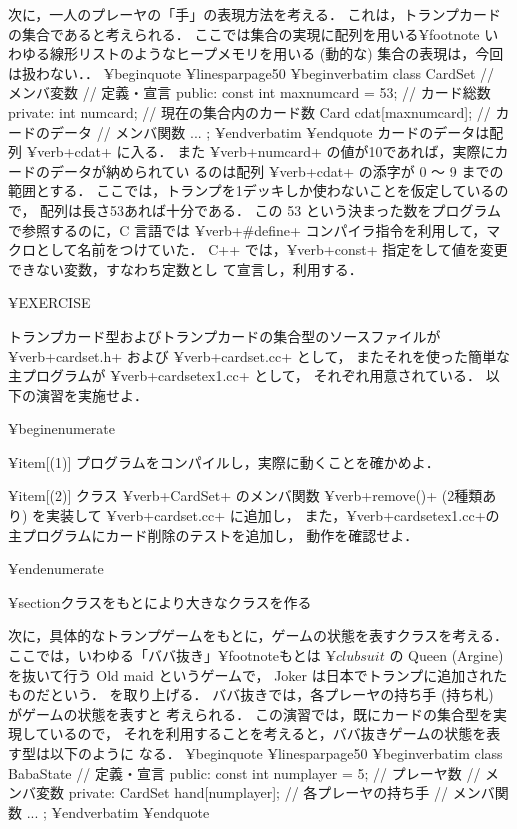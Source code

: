 {{{{{次に，一人のプレーヤの「手」の表現方法を考える．
これは，トランプカードの集合であると考えられる．
ここでは集合の実現に配列を用いる¥footnote{
いわゆる線形リストのようなヒープメモリを用いる (動的な) 集合の表現は，今回は扱わない．}．
¥begin{quote}
¥linesparpage{50}
¥begin{verbatim}
class CardSet {
// メンバ変数
// 定義・宣言
public:
        const int maxnumcard = 53;      // カード総数
private:
        int numcard;            // 現在の集合内のカード数
        Card cdat[maxnumcard];  // カードのデータ
// メンバ関数
	...
};
¥end{verbatim}
¥end{quote}
カードのデータは配列 ¥verb+cdat+ に入る．
また ¥verb+numcard+ の値が10であれば，実際にカードのデータが納められてい
るのは配列 ¥verb+cdat+ の添字が 0 〜 9 までの範囲とする．
ここでは，トランプを1デッキしか使わないことを仮定しているので，
配列は長さ53あれば十分である．
この 53 という決まった数をプログラムで参照するのに，C 言語では
¥verb+#define+ コンパイラ指令を利用して，マクロとして名前をつけていた．
C++ では，¥verb+const+ 指定をして値を変更できない変数，すなわち定数とし
て宣言し，利用する．

¥EXERCISE{
トランプカード型およびトランプカードの集合型のソースファイルが
¥verb+cardset.h+ および ¥verb+cardset.cc+ として，
またそれを使った簡単な主プログラムが ¥verb+cardsetex1.cc+ として，
それぞれ用意されている．
以下の演習を実施せよ．

¥begin{enumerate}

¥item[(1)] プログラムをコンパイルし，実際に動くことを確かめよ．

¥item[(2)] クラス ¥verb+CardSet+ のメンバ関数 ¥verb+remove()+ (2種類あり)
を実装して ¥verb+cardset.cc+ に追加し，
また，¥verb+cardsetex1.cc+の主プログラムにカード削除のテストを追加し，
動作を確認せよ．

¥end{enumerate}

}


¥section{クラスをもとにより大きなクラスを作る}

次に，具体的なトランプゲームをもとに，ゲームの状態を表すクラスを考える．
ここでは，いわゆる「ババ抜き」¥footnote{もとは $¥clubsuit$ の Queen
(Argine) を抜いて行う Old maid というゲームで，
Joker は日本でトランプに追加されたものだという．}
を取り上げる．
ババ抜きでは，各プレーヤの持ち手 (持ち札) がゲームの状態を表すと
考えられる．
この演習では，既にカードの集合型を実現しているので，
それを利用することを考えると，ババ抜きゲームの状態を表す型は以下のように
なる．
¥begin{quote}
¥linesparpage{50}
¥begin{verbatim}
class BabaState {
// 定義・宣言
public:
        const int numplayer = 5;        // プレーヤ数
// メンバ変数
private:
        CardSet hand[numplayer];  // 各プレーヤの持ち手
// メンバ関数
        ...
};
¥end{verbatim}
¥end{quote}

}}}}}
